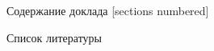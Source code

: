 \documentclass[notheorems, aspectratio=169]{beamer}
\date{июнь 2025 г.}
\theoremstyle{named}
\theoremstyle{newblock}
\theoremstyle{newblock}
\theoremstyle{newblock}
\theoremstyle{newblock}
\begin{document}



\begin{frame}{Содержание доклада}
    [sections numbered]
    \tableofcontents%
\end{frame}





\begin{frame}[allowframebreaks]{Список литературы}
    \printbibliography
\end{frame}
\end{document}

